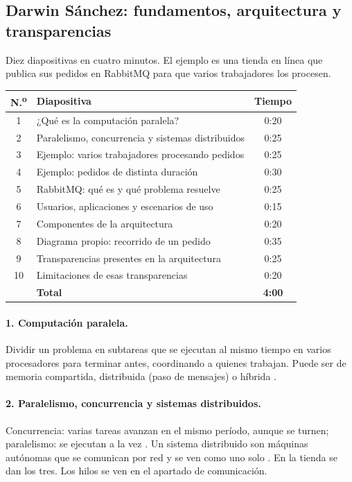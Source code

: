\subsection*{Darwin Sánchez: fundamentos, arquitectura y transparencias}

Diez diapositivas en cuatro minutos. El ejemplo es una tienda en línea que
publica sus pedidos en RabbitMQ para que varios trabajadores los procesen.

\begin{table}[H]
\centering
\small
\begin{tabular}{@{}clc@{}}
\toprule
\textbf{N.\textsuperscript{o}} & \textbf{Diapositiva} & \textbf{Tiempo} \\
\midrule
1 & ¿Qué es la computación paralela? & 0:20 \\
2 & Paralelismo, concurrencia y sistemas distribuidos & 0:25 \\
3 & Ejemplo: varios trabajadores procesando pedidos & 0:25 \\
4 & Ejemplo: pedidos de distinta duración & 0:30 \\
5 & RabbitMQ: qué es y qué problema resuelve & 0:25 \\
6 & Usuarios, aplicaciones y escenarios de uso & 0:15 \\
7 & Componentes de la arquitectura & 0:20 \\
8 & Diagrama propio: recorrido de un pedido & 0:35 \\
9 & Transparencias presentes en la arquitectura & 0:25 \\
10 & Limitaciones de esas transparencias & 0:20 \\
\midrule
 & \textbf{Total} & \textbf{4:00} \\
\bottomrule
\end{tabular}
\end{table}

\paragraph{1. Computación paralela.}
Dividir un problema en subtareas que se ejecutan al mismo tiempo en varios
procesadores para terminar antes, coordinando a quienes trabajan. Puede ser
de memoria compartida, distribuida (paso de mensajes) o híbrida
\cite{dai2025parallel}.

\paragraph{2. Paralelismo, concurrencia y sistemas distribuidos.}
Concurrencia: varias tareas avanzan en el mismo período, aunque se turnen;
paralelismo: se ejecutan a la vez \cite{reinders2023}. Un sistema distribuido
son máquinas autónomas que se comunican por red y se ven como uno solo
\cite{vansteen2023distributed}. En la tienda se dan los tres. Los hilos se
ven en el apartado de comunicación.

